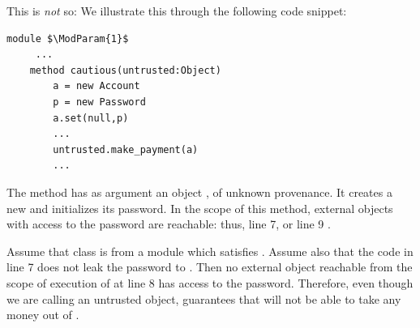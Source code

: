 {
This is \emph{not} so: %
We illustrate this through the following  code snippet:
 

\begin{lstlisting}[mathescape=true, language=chainmail,xleftmargin=2em,frame=lines,framexleftmargin=1.5em]
module $\ModParam{1}$
     ...
    method cautious(untrusted:Object)
        a = new Account
        p = new Password
        a.set(null,p)
        ...
        untrusted.make_payment(a)
        ...
\end{lstlisting}
 

{The method  has as  argument an object , of unknown provenance.
{It} creates a new  and initializes its password. 
In the scope of this method,  external objects with access to the password are reachable:
thus,  line 7, or   line {9} .
}

{Assume that class  is from a module which satisfies \SrobustB. 
Assume also that the code in line 7 does not leak the password to . Then no external object
reachable from the scope of execution of  at line 8 has access to the password.
Therefore, 
even though we are calling   an untrusted object, \SrobustB guarantees that 
 will not be able to take any money out of  .
 }
 
 
}
